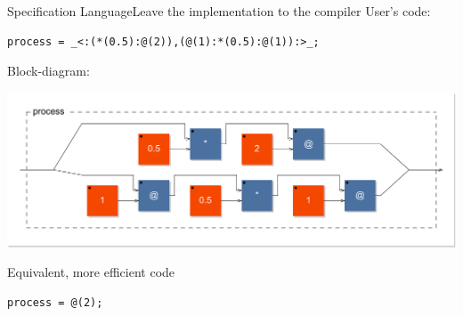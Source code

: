 \begin{frame}[fragile]{Specification Language}{Leave the implementation to the compiler}
User's code:
\begin{lstlisting}
process = _<:(*(0.5):@(2)),(@(1):*(0.5):@(1)):>_;
\end{lstlisting}

Block-diagram:
\begin{center}
    \includegraphics[scale=0.4]{images/equiv1-diag}
\end{center}

Equivalent, more efficient code
\begin{lstlisting}
process = @(2);
\end{lstlisting}

\end{frame}
